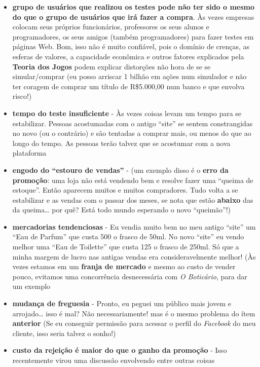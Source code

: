 \documentclass[11pt]{article}
\begin{document}
\begin{itemize}
\item
  \textbf{grupo de usuários que realizou os testes pode não ter sido o
  mesmo do que o grupo de usuários que irá fazer a compra}. Às vezes
  empresas colocam seus próprios funcionários, professores os seus
  alunos e programadores, os seus amigos (também programadores) para
  fazer testes em páginas Web. Bom, isso não é muito confiável, pois o
  domínio de crenças, as esferas de valores, a capacidade econômica e
  outros fatores explicados pela \textbf{Teoria dos Jogos} podem
  explicar distorções não hora de se se simular/comprar (eu posso
  arriscar 1 bilhão em ações num simulador e não ter coragem de comprar
  um título de R\$5.000,00 num banco e que envolva risco!)
\item
  \textbf{tempo do teste insuficiente} - Às vezes coisas levam um tempo
  para se estabilizar. Pessoas acostumadas com o antigo ``site'' se
  sentem constrangidas no novo (ou o contrário) e são tentadas a comprar
  mais, ou menos do que ao longo do tempo. As pessoas terão talvez que
  se acostumar com a nova plataforma
\item
  \textbf{engodo do ``estouro de vendas''} - (um exemplo disso é o
  \textbf{erro da promoção}: uma loja não está vendendo bem e resolve
  fazer uma ``queima de estoque''. Então aparecem muitos e muitos
  compradores. Tudo volta a se estabilizar e as vendas com o passar dos
  meses, se nota que estão \textbf{abaixo} das da queima\ldots{} por
  quê? Está todo mundo esperando o novo ``queimão''!)
\item
  \textbf{mercadorias tendenciosas} - Eu vendia muito bem no meu antigo
  ``site'' um ``Eau de Parfum'' que custa 500 o frasco de 50ml. No novo
  ``site'' eu vendo melhor uma ``Eau de Toilette'' que custa 125 o
  frasco de 250ml. Só que a minha margem de lucro nas antigas vendas era
  consideravelmente melhor! (Às vezes estamos em um \textbf{franja de
  mercado} e mesmo ao custo de vender pouco, evitamos uma concorrência
  desnecessária com \emph{O Boticário}, para dar um exemplo
\item
  \textbf{mudança de freguesia} - Pronto, eu peguei um público mais
  jovem e arrojado\ldots{} isso é mal? Não necessariamente! mas é o
  mesmo problema do ítem \textbf{anterior} (Se eu conseguir permissão
  para acessar o perfil do \emph{Facebook} do meu cliente, isso seria
  talvez o sonho!)
\item
  \textbf{custo da rejeição é maior do que o ganho da promoção} - Isso
  recentemente virou uma discussão envolvendo entre outras coisas

\end{itemize}
\end{document}
